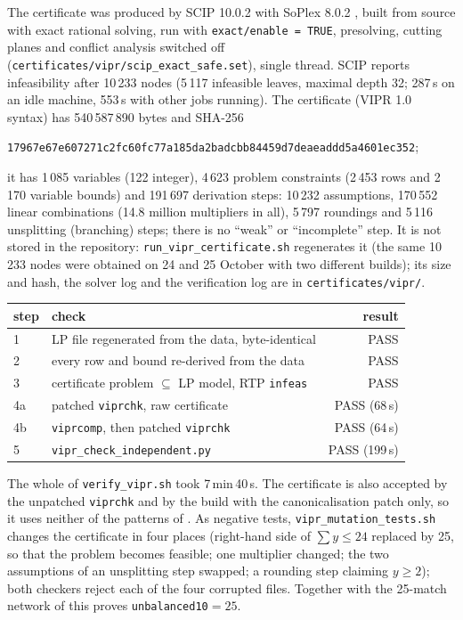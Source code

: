 \documentclass[11pt,a4paper]{report}
\newcommand*{\inst}[1]{\texttt{#1}}
\begin{document}
The certificate was produced by SCIP 10.0.2 with SoPlex 8.0.2 \autocite{SCIP1002,EiflerGleixner2023}, built from
source with exact rational solving, run with \texttt{exact/enable = TRUE}, presolving, cutting planes and conflict
analysis switched off (\texttt{certificates/vipr/scip\_exact\_safe.set}), single thread. SCIP reports
infeasibility after 10\,233 nodes (5\,117 infeasible leaves, maximal depth 32; 287\,s on an idle machine, 553\,s
with other jobs running). The certificate (VIPR 1.0 syntax) has 540\,587\,890 bytes and SHA-256
\begin{center}\small\texttt{17967e67e607271c2fc60fc77a185da2badcbb84459d7deaeaddd5a4601ec352};\end{center} it has 1\,085 variables (122 integer), 4\,623 problem constraints
(2\,453 rows and 2\,170 variable bounds) and 191\,697 derivation steps: 10\,232 assumptions, 170\,552 linear
combinations (14.8 million multipliers in all), 5\,797 roundings and 5\,116 unsplitting (branching) steps; there is no
``weak'' or ``incomplete'' step. It is not stored in the repository: \texttt{run\_vipr\_certificate.sh} regenerates it
(the same 10\,233 nodes were obtained on 24 and 25 October with two different builds); its size and hash, the solver
log and the verification log are in \texttt{certificates/vipr/}.

\begin{center}\small
\begin{tabular}{llr}
\toprule
step & check & result \\
\midrule
1 & LP file regenerated from the data, byte-identical & PASS \\
2 & every row and bound re-derived from the data & PASS \\
3 & certificate problem $\subseteq$ LP model, RTP \texttt{infeas} & PASS \\
4a & patched \texttt{viprchk}, raw certificate & PASS (68\,s) \\
4b & \texttt{viprcomp}, then patched \texttt{viprchk} & PASS (64\,s) \\
5 & \texttt{vipr\_check\_independent.py} & PASS (199\,s) \\
\bottomrule
\end{tabular}
\end{center}

The whole of \texttt{verify\_vipr.sh} took 7\,min\,40\,s. The certificate is also accepted by the unpatched
\texttt{viprchk} and by the build with the canonicalisation patch only, so it uses neither of the patterns of
. As negative tests, \texttt{vipr\_mutation\_tests.sh} changes the certificate in four places
(right-hand side of $\sum y\le24$ replaced by 25, so that the problem becomes feasible; one multiplier changed; the
two assumptions of an unsplitting step swapped; a rounding step claiming $y\ge2$); both checkers reject each of the
four corrupted files. Together with the 25-match network of  this proves \inst{unbalanced10}${}=25$.
\end{document}

